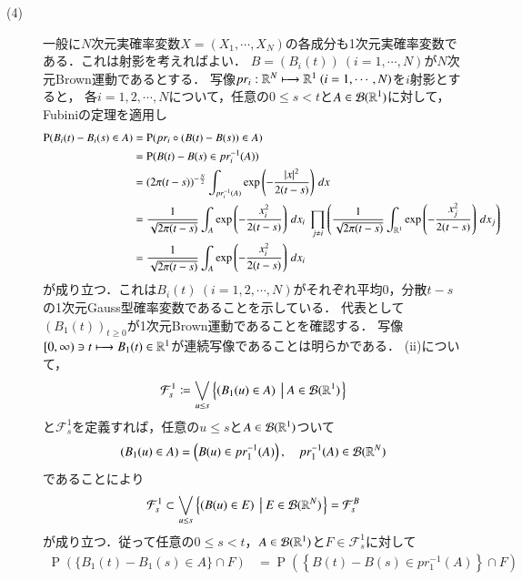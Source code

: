 \begin{prf}
\begin{description}
	\item[(4)] 
		一般に$N$次元実確率変数$X = (X_1, \cdots, X_N)$の各成分も1次元実確率変数である．これは射影を考えればよい．
		$B = (B_i(t))\ (i=1,\cdots,N)$が$N$次元Brown運動であるとする．
		写像$pr_i : \R^N \longmapsto \R^1\ (i=1,\cdots,N)$を$i$射影とすると，
		各$i=1,2,\cdots,N$について，任意の$0 \leq s < t$と$A \in \mathcal{B}(\mathbb{R}^1)$に対して，Fubiniの定理を適用し
		\begin{align}
			\operatorname{P}(B_i(t) - B_i(s) \in A) 
			&= \operatorname{P}(pr_i \circ (B(t) - B(s)) \in A) \\
			&= \operatorname{P}(B(t) - B(s) \in pr_i^{-1}(A)) \\
			&= (2 \pi (t-s))^{-\frac{N}{2}} \int_{pr_i^{-1}(A)} \mathrm{exp} \left( -\frac{|x|^2}{2(t-s)} \right)\, dx \\
			&= \frac{1}{\sqrt{2 \pi (t-s)}} \int_{A} \mathrm{exp} \left( -\frac{x_i^2}{2(t-s)} \right)\, dx_i 
				\ \prod_{j \neq i} \left(\frac{1}{\sqrt{2 \pi (t-s)}} \int_{\mathbb{R}^1} \mathrm{exp} \left( -\frac{x_j^2}{2(t-s)} \right)\, dx_j \right) \\
			&= \frac{1}{\sqrt{2 \pi (t-s)}} \int_{A} \mathrm{exp} \left( -\frac{x_i^2}{2(t-s)} \right)\, dx_i 
		\end{align}
		が成り立つ．これは$B_i(t)\ (i=1,2,\cdots,N)$がそれぞれ平均0，分散$t-s$の1次元Gauss型確率変数であることを示している．
		代表として$(B_1(t))_{t \geq 0}$が1次元Brown運動であることを確認する．
		写像$[0,\infty) \ni t \longmapsto B_1(t) \in \mathbb{R}^1$が連続写像であることは明らかである．
		(ii)について，
		\begin{align}
			\mathcal{F}_s^1 \coloneqq \bigvee_{u \leq s} \left\{ (B_1(u) \in A)\ \left|\ A \in \mathcal{B}(\mathbb{R}^1) \right.\right\}
		\end{align}
		と$\mathcal{F}_s^1$を定義すれば，任意の$u \leq s$と$A \in \mathcal{B}(\mathbb{R}^1)$ついて
		\begin{align}
			(B_1(u) \in A) = \left(B(u) \in pr_1^{-1}(A)\right), \quad pr_1^{-1}(A) \in \mathcal{B}(\mathbb{R}^N)
		\end{align}
		であることにより
		\begin{align}
			\mathcal{F}_s^1 \subset \bigvee_{u \leq s} \left\{ (B(u) \in E)\ \left|\ E \in \mathcal{B}(\mathbb{R}^N) \right.\right\} = \mathcal{F}_s^B
		\end{align}
		が成り立つ．従って任意の$0 \leq s < t$，$A \in \mathcal{B}(\mathbb{R}^1)$と$F \in \mathcal{F}_s^1$に対して
		\begin{align}
			\operatorname{P}(\{B_1(t) - B_1(s) \in A\} \cap F)
			&= \operatorname{P}\left( \left\{ B(t) - B(s) \in pr_1^{-1}(A)\right\} \cap F\right) \\

\end{align}
\end{description}
\end{prf}
